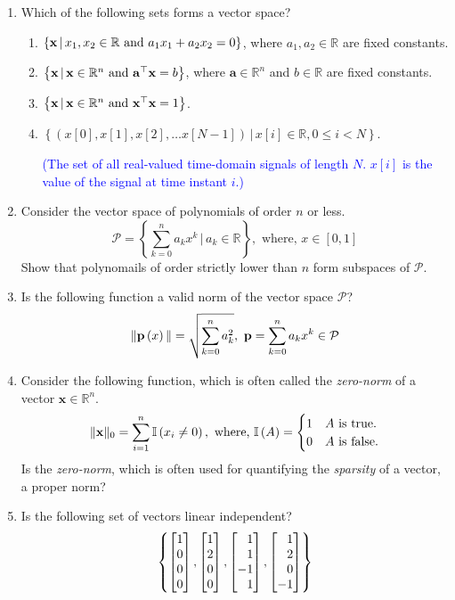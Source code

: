 \documentclass[
10pt, %
a4paper, %
oneside, %
headinclude,footinclude, %
BCOR5mm, %
]{scrartcl}
\def\mf{\ensuremath\mathbf}
\def\bmx{\ensuremath\begin{bmatrix*}[r]}
\def\emx{\ensuremath\end{bmatrix*}}
\begin{document}
\begin{enumerate}

\item Which of the following sets forms a vector space?
\begin{enumerate}
	\item $\left\{ \mf{x} \, \vert \, x_1, x_2 \in \mathbb{R} \text{ and } a_1x_1 + a_2 x_2 = 0 \right\}$, where $a_1, a_2 \in \mathbb{R}$ are fixed constants.
	\item $\left\{ \mf{x} \, \vert \, \mathbf{x} \in \mathbb{R}^n \text{ and } \mathbf{a}^\top \mathbf{x} = b \right\}$, where $\mathbf{a} \in \mathbb{R}^n$ and $b \in \mathbb{R}$ are fixed constants.
	\item $\left\{ \mf{x} \, \vert \, \mathbf{x} \in \mathbb{R}^n \text{ and } \mathbf{x}^\top \mathbf{x} = 1 \right\}$.
	\item $\left\{ \left(x[0], x[1], x[2], \ldots x[N-1]\right) \, \vert \, x[i] \in \mathbb{R}, 0 \leq i < N \right\}$.
	
	\textcolor{blue}{(\small{The set of all real-valued time-domain signals of length $N$. $x[i]$ is the value of the signal at time instant $i$.})}
\end{enumerate}

\item Consider the vector space of polynomials of order $n$ or less.
\[ \mathcal{P} = \left\{ \sum_{k=0}^n a_k x^k \, \bigg\vert \, a_k \in \mathbb{R} \right\}, \,\, \text{where, } x \in \left[0, 1\right] \]
Show that polynomails of order strictly lower than $n$ form subspaces of $\mathcal{P}$.

\item Is the following function a valid norm of the vector space $\mathcal{P}$?
\[ \Vert \mathbf{p}\left( x\right) \Vert = \sqrt{\sum_{k=0}^{n} a_k^2 }, \,\, \mathbf{p} = \sum_{k=0}^n a_kx^k \in \mathcal{P} \]

\item Consider the following function, which is often called the \textit{zero-norm} of a vector $\mathbf{x} \in \mathbb{R}^n$.
\[ \Vert \mathbf{x} \Vert_0 = \sum_{i=1}^n \mathbb{I}\left( x_i \neq 0\right), \,\, \text{where, } \mathbb{I}\left( A\right) = \begin{cases} 1 & A \text{ is true.} \\ 0 & A \text{ is false.}  \end{cases}  \] 
Is the \textit{zero-norm}, which is often used for quantifying the \textit{sparsity} of a vector, a proper norm?

\item Is the following set of vectors linear independent?
\[ \left\{ \bmx 1 \\ 0 \\ 0 \\ 0 \emx, \bmx 1 \\ 2 \\ 0 \\ 0 \emx , \bmx 1 \\ 1 \\ -1 \\ 1 \emx , \bmx 1 \\ 2 \\ 0 \\ -1 \emx  \right\} \]


\end{enumerate}
\end{document}
